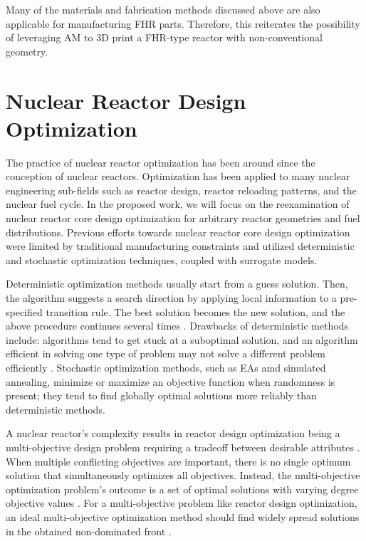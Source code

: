 Many of the materials and fabrication methods discussed above are also applicable 
for manufacturing \gls{FHR} parts. 
Therefore, this reiterates the possibility of leveraging \gls{AM} to 3D print a
\gls{FHR}-type reactor with non-conventional geometry. 

\section{Nuclear Reactor Design Optimization}
\label{sec:opt}
The practice of nuclear reactor optimization has been around since the 
conception of nuclear reactors. 
Optimization has been applied to many nuclear engineering sub-fields such 
as reactor design, reactor reloading patterns, and the nuclear fuel cycle.  
In the proposed work, we will focus on the reexamination of nuclear reactor core 
design optimization for arbitrary reactor geometries and fuel distributions. 
Previous efforts towards nuclear reactor core design optimization were limited by 
traditional manufacturing constraints and utilized deterministic and stochastic 
optimization techniques, coupled with surrogate models. 

Deterministic optimization methods usually start from a guess solution.
Then, the algorithm suggests a search direction by applying local 
information to a pre-specified transition rule. 
The best solution becomes the new solution, and the above procedure continues 
several times \cite{deb_multi-objective_2001}. 
Drawbacks of deterministic methods include: algorithms tend to get stuck at a 
suboptimal solution, and an algorithm efficient in solving one type of problem 
may not solve a different problem efficiently \cite{deb_multi-objective_2001}. 
Stochastic optimization methods, such as \glspl{EA} amd simulated annealing,  
minimize or maximize an objective function when randomness is present; they 
tend to find globally optimal solutions more reliably than deterministic methods. 

A nuclear reactor's complexity results in reactor design optimization being a 
multi-objective design problem requiring a tradeoff between desirable 
attributes \cite{byrne_evolving_2014,simon_sciences_2019}. 
When multiple conflicting objectives are important, there is no single optimum 
solution that simultaneously optimizes all objectives. 
Instead, the multi-objective optimization problem's outcome is a set of optimal 
solutions with varying degree objective values \cite{deb_multi-objective_2001}. 
For a multi-objective problem like reactor design optimization, 
an ideal multi-objective optimization method should find widely spread solutions 
in the obtained non-dominated front \cite{deb_multi-objective_2001}. 

